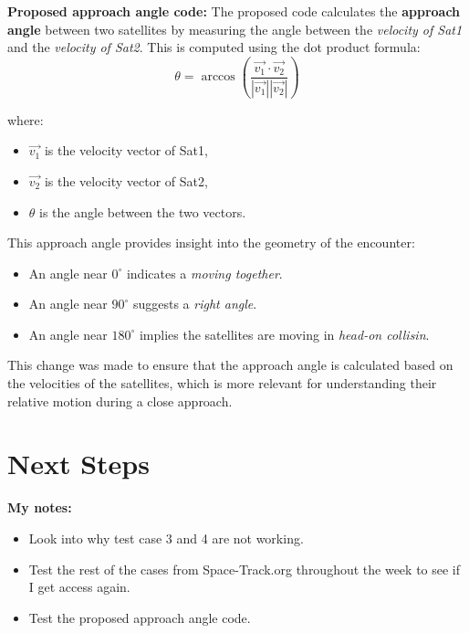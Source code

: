 \documentclass[12pt]{report}
\begin{document}
\begin{enumerate}
  \textbf{Proposed approach angle code: }
  \newline\newline
  The proposed code calculates the \textbf{approach angle} between two satellites by measuring the angle between the \textit{velocity of Sat1} and the \textit{velocity of Sat2}.
  \newline\newline
  This is computed using the dot product formula:
  \begin{equation}
  \theta = \arccos\left(\frac{\vec{v_1} \cdot \vec{v_2}}{|\vec{v_1}| |\vec{v_2}|}\right)
  \end{equation}

  where:
  \begin{itemize}
    \item $\vec{v_1}$ is the velocity vector of Sat1,
    \item $\vec{v_2}$ is the velocity vector of Sat2,
    \item $\theta$ is the angle between the two vectors.
  \end{itemize}

  This approach angle provides insight into the geometry of the encounter:
  \begin{itemize}
    \item An angle near $0^\circ$ indicates a \textit{moving together}.
    \item An angle near $90^\circ$ suggests a \textit{right angle}.
    \item An angle near $180^\circ$ implies the satellites are moving in \textit{head-on collisin}.
  \end{itemize}
  This change was made to ensure that the approach angle is calculated based on the velocities of the satellites, which is more relevant for understanding their relative motion during a close approach.

\end{enumerate}

\chapter*{Next Steps}

\textbf{My notes:}
\begin{itemize}
  \item Look into why test case 3 and 4 are not working.
  \item Test the rest of the cases from Space-Track.org throughout the week to see if I get access again.
  \item Test the proposed approach angle code.
\end{itemize}
\end{document}
